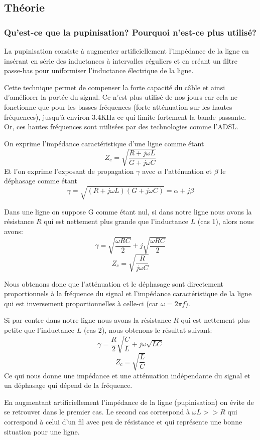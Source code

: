 \subsection{Théorie}

\subsubsection{Qu'est-ce que la pupinisation? Pourquoi n'est-ce plus utilisé?}

La pupinisation consiste à augmenter artificiellement l'impédance de la ligne en insérant en série des inductances à intervalles réguliers et en créant un filtre passe-bas pour uniformiser l'inductance électrique de la ligne.

Cette technique permet de compenser la forte capacité du câble et ainsi d'améliorer la portée du signal. Ce n'est plus utilisé de nos jours car cela ne fonctionne que pour les basses fréquences (forte atténuation sur les hautes fréquences), jusqu'à environ 3.4KHz ce qui limite fortement la bande passante. Or, ces hautes fréquences sont utilisées par des technologies comme l'ADSL.

On exprime l'impédance caractéristique d'une ligne comme étant $$Z_c = \sqrt{\frac{R + j\omega L}{G + j\omega C}}$$ Et l'on exprime l'exposant de propagation $\gamma$ avec $\alpha$ l'atténuation et $\beta$ le déphasage comme étant $$\gamma = \sqrt{(R + j\omega L)(G + j\omega C)} = \alpha + j\beta$$ 

Dans une ligne on suppose G comme étant nul, si dans notre ligne nous avons la résistance $R$ qui est nettement plus grande que l'inductance $L$ (cas 1), alors nous avons: $$\gamma = \sqrt{\frac{\omega RC}{2}} + j\sqrt{\frac{\omega RC}{2}}$$ $$Z_c = \sqrt{\frac{R}{j\omega C}}$$

Nous obtenons donc que l'atténuation et le déphasage sont directement proportionnels à la fréquence du signal et l'impédance caractéristique de la ligne qui est inversement proportionnelles à celle-ci (car $\omega = 2\pi f$).

Si par contre dans notre ligne nous avons la résistance $R$ qui est
nettement plus petite que l'inductance $L$ (cas 2), nous obtenons le résultat suivant: $$\gamma = \frac{R}{2}\sqrt{\frac{C}{L}} + j\omega \sqrt{LC}$$ $$Z_c = \sqrt{\frac{L}{C}}$$ Ce qui nous donne une impédance et une atténuation indépendante du signal et un déphasage qui dépend de la fréquence.

En augmentant artificiellement l'impédance de la ligne (pupinisation) on évite de se retrouver dans le premier cas. Le second cas correspond à $\omega L >> R$ qui correspond à celui d'un fil avec peu de résistance et qui représente une bonne situation pour une ligne.

